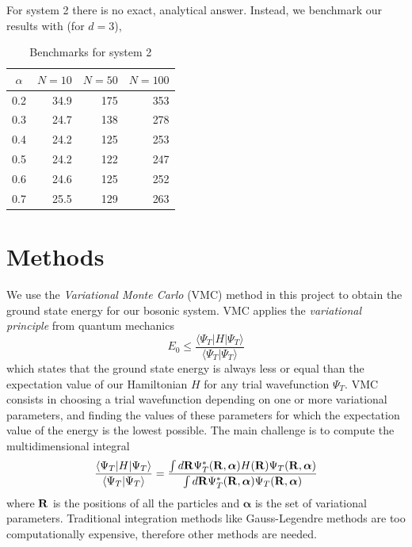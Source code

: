 \documentclass[english, a4paper]{article}
\begin{document}
\noindent For system 2 there is no exact, analytical answer. Instead, we benchmark
our results with \cite{ref1} (for $d=3$),
\begin{table}[H]
  \centering
  \begin{tabular}{ | c | r | r | r | }
    \hline
    $\alpha$& $N=10$& $N=50$& $N=100$ \\*
    \hline
    0.2& 34.9& 175& 353 \\*
    \hline
    0.3& 24.7& 138& 278 \\*
    \hline
    0.4& 24.2& 125& 253 \\*
    \hline
    0.5& 24.2& 122& 247 \\*
    \hline
    0.6& 24.6& 125& 252 \\*
    \hline
    0.7& 25.5& 129& 263 \\*
    \hline
  \end{tabular}
  \caption{Benchmarks for system 2}
  \label{tab:benchmarks}
\end{table}







\section{Methods}

We use the \textit{Variational Monte Carlo} (VMC) method in this project to obtain the ground state energy
for our bosonic system. VMC applies the \textit{variational principle} from quantum mechanics
\begin{equation}
 E_0 \leq \frac{\langle \Psi_T | H | \Psi_T \rangle}{\langle \Psi_T | \Psi_T \rangle}
\end{equation}
which states that the ground state energy is always less or equal than the expectation value of our Hamiltonian $H$
for any trial wavefunction $\Psi_T$. VMC consists in choosing a trial wavefunction depending on one or more
variational parameters, and finding the values of these parameters for which the expectation value of the 
energy is the lowest possible. The main challenge is to compute the multidimensional integral
\begin{equation}
 \frac{\langle \Psi_T | H | \Psi_T \rangle}{\langle \Psi_T | \Psi_T \rangle} = 
 \frac{\int d {\bf R} \Psi_T^*({\bf R}, \boldsymbol{\alpha}) H({\bf R}) \Psi_T({\bf R}, \boldsymbol{\alpha})}
       {\int d {\bf R} \Psi_T^*({\bf R}, \boldsymbol{\alpha}) \Psi_T({\bf R}, \boldsymbol{\alpha})}
 \label{multidim}
\end{equation}
where $\bf{R}$ is the positions of all the particles and $\boldsymbol{\alpha}$ is the set of variational parameters.
Traditional integration methods like Gauss-Legendre methods are too computationally expensive, therefore 
other methods are needed.
\end{document}
